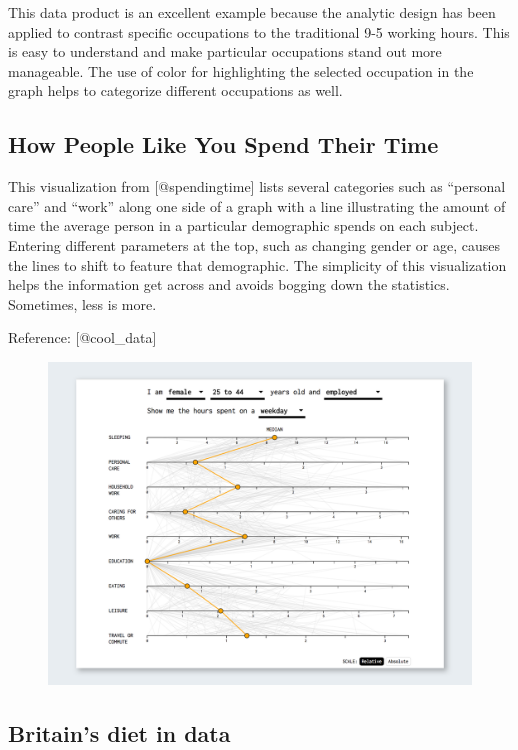 \documentclass[]{book}
\theoremstyle{definition}
\theoremstyle{definition}
\theoremstyle{definition}
\theoremstyle{remark}
\begin{document}
This data product is an excellent example because the analytic design
has been applied to contrast specific occupations to the traditional 9-5
working hours. This is easy to understand and make particular
occupations stand out more manageable. The use of color for highlighting
the selected occupation in the graph helps to categorize different
occupations as well.

\subsection{How People Like You Spend Their
Time}\label{how-people-like-you-spend-their-time}

This visualization from {[}@spendingtime{]} lists several categories
such as ``personal care'' and ``work'' along one side of a graph with a
line illustrating the amount of time the average person in a particular
demographic spends on each subject. Entering different parameters at the
top, such as changing gender or age, causes the lines to shift to
feature that demographic. The simplicity of this visualization helps the
information get across and avoids bogging down the statistics.
Sometimes, less is more.

Reference: {[}@cool\_data{]}

\begin{figure}
\centering
\includegraphics{images/SpendingTime.png}
\caption{}
\end{figure}

\subsection{Britain's diet in data}\label{britains-diet-in-data}
\end{document}
